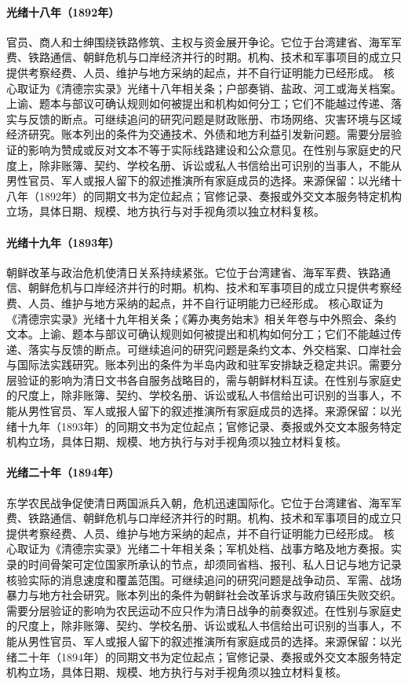\hypertarget{public:EQ-1892-RAILWAY-DEBATE}{}\paragraph{光绪十八年（1892年）}官员、商人和士绅围绕铁路修筑、主权与资金展开争论。它位于台湾建省、海军军费、铁路通信、朝鲜危机与口岸经济并行的时期。机构、技术和军事项目的成立只提供考察经费、人员、维护与地方采纳的起点，并不自行证明能力已经形成。 核心取证为《清德宗实录》光绪十八年相关条；户部奏销、盐政、河工或海关档案。上谕、题本与部议可确认规则如何被提出和机构如何分工；它们不能越过传递、落实与反馈的断点。可继续追问的研究问题是财政账册、市场网络、灾害环境与区域经济研究。账本列出的条件为交通技术、外债和地方利益引发新问题。需要分层验证的影响为赞成或反对文本不等于实际线路建设和公众意见。在性别与家庭史的尺度上，除非账簿、契约、学校名册、诉讼或私人书信给出可识别的当事人，不能从男性官员、军人或报人留下的叙述推演所有家庭成员的选择。来源保留：以光绪十八年（1892年）的同期文书为定位起点；官修记录、奏报或外交文本服务特定机构立场，具体日期、规模、地方执行与对手视角须以独立材料复核。
\hypertarget{public:EQ-1893-KOREAN-REFORM-CRISIS}{}\paragraph{光绪十九年（1893年）}朝鲜改革与政治危机使清日关系持续紧张。它位于台湾建省、海军军费、铁路通信、朝鲜危机与口岸经济并行的时期。机构、技术和军事项目的成立只提供考察经费、人员、维护与地方采纳的起点，并不自行证明能力已经形成。 核心取证为《清德宗实录》光绪十九年相关条；《筹办夷务始末》相关年卷与中外照会、条约文本。上谕、题本与部议可确认规则如何被提出和机构如何分工；它们不能越过传递、落实与反馈的断点。可继续追问的研究问题是条约文本、外交档案、口岸社会与国际法实践研究。账本列出的条件为半岛内政和驻军安排缺乏稳定共识。需要分层验证的影响为清日文书各自服务战略目的，需与朝鲜材料互读。在性别与家庭史的尺度上，除非账簿、契约、学校名册、诉讼或私人书信给出可识别的当事人，不能从男性官员、军人或报人留下的叙述推演所有家庭成员的选择。来源保留：以光绪十九年（1893年）的同期文书为定位起点；官修记录、奏报或外交文本服务特定机构立场，具体日期、规模、地方执行与对手视角须以独立材料复核。
\hypertarget{public:EQ-1894-DONGHAK-PEASANT-WAR}{}\paragraph{光绪二十年（1894年）}东学农民战争促使清日两国派兵入朝，危机迅速国际化。它位于台湾建省、海军军费、铁路通信、朝鲜危机与口岸经济并行的时期。机构、技术和军事项目的成立只提供考察经费、人员、维护与地方采纳的起点，并不自行证明能力已经形成。 核心取证为《清德宗实录》光绪二十年相关条；军机处档、战事方略及地方奏报。实录的时间骨架可定位国家所承认的节点，却须同省档、报刊、私人日记与地方记录核验实际的消息速度和覆盖范围。可继续追问的研究问题是战争动员、军需、战场暴力与地方社会研究。账本列出的条件为朝鲜社会改革诉求与政府镇压失败交织。需要分层验证的影响为农民运动不应只作为清日战争的前奏叙述。在性别与家庭史的尺度上，除非账簿、契约、学校名册、诉讼或私人书信给出可识别的当事人，不能从男性官员、军人或报人留下的叙述推演所有家庭成员的选择。来源保留：以光绪二十年（1894年）的同期文书为定位起点；官修记录、奏报或外交文本服务特定机构立场，具体日期、规模、地方执行与对手视角须以独立材料复核。
